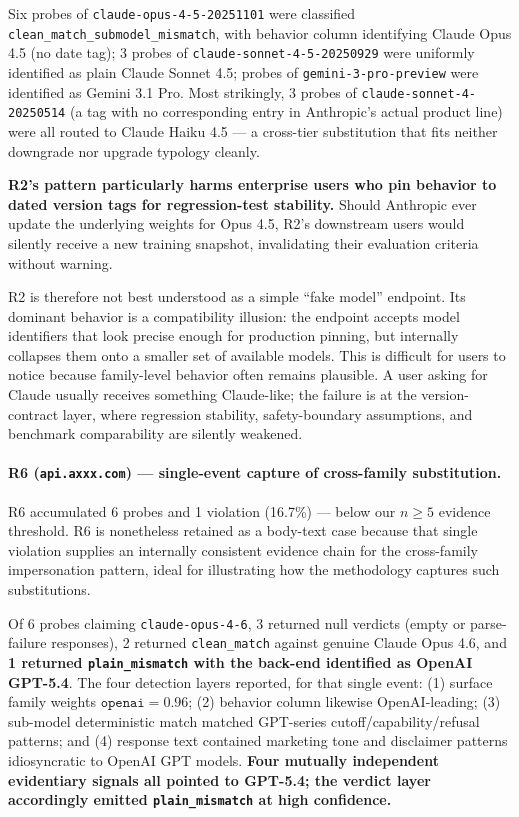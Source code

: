 \documentclass[10pt,a4paper,twocolumn]{article}
\begin{document}
Six probes of \texttt{claude-opus-4-5-20251101} were classified
\texttt{clean\_match\_submodel\_mismatch}, with behavior column identifying
Claude Opus 4.5 (no date tag); 3 probes of \texttt{claude-sonnet-4-5-20250929}
were uniformly identified as plain Claude Sonnet 4.5; probes of
\texttt{gemini-3-pro-preview} were identified as Gemini 3.1 Pro. Most
strikingly, 3 probes of \texttt{claude-sonnet-4-20250514} (a tag with no
corresponding entry in Anthropic's actual product line) were all routed to
Claude Haiku 4.5 --- a cross-tier substitution that fits neither downgrade nor
upgrade typology cleanly.

\textbf{R2's pattern particularly harms enterprise users who pin behavior to
dated version tags for regression-test stability.} Should Anthropic ever update
the underlying weights for Opus 4.5, R2's downstream users would silently
receive a new training snapshot, invalidating their evaluation criteria
without warning.

R2 is therefore not best understood as a simple ``fake model'' endpoint. Its
dominant behavior is a compatibility illusion: the endpoint accepts model
identifiers that look precise enough for production pinning, but internally
collapses them onto a smaller set of available models. This is difficult for
users to notice because family-level behavior often remains plausible. A user
asking for Claude usually receives something Claude-like; the failure is at
the version-contract layer, where regression stability, safety-boundary
assumptions, and benchmark comparability are silently weakened.

\paragraph{R6 (\texttt{api.axxx.com}) --- single-event capture of cross-family substitution.}
R6 accumulated 6 probes and 1 violation (16.7\%) --- below our $n{\geq}5$
evidence threshold. R6 is nonetheless retained as a body-text case because that
single violation supplies an internally consistent evidence chain for the cross-family
impersonation pattern, ideal for illustrating how the methodology captures
such substitutions.

Of 6 probes claiming \texttt{claude-opus-4-6}, 3 returned null verdicts (empty
or parse-failure responses), 2 returned \texttt{clean\_match} against genuine
Claude Opus 4.6, and \textbf{1 returned \texttt{plain\_mismatch} with the
back-end identified as OpenAI GPT-5.4}. The four detection layers reported,
for that single event: (1) surface family weights $\texttt{openai}=0.96$;
(2) behavior column likewise OpenAI-leading; (3) sub-model deterministic match
matched GPT-series cutoff/capability/refusal patterns; and (4) response text
contained marketing tone and disclaimer patterns idiosyncratic to OpenAI GPT
models. \textbf{Four mutually independent evidentiary signals all pointed to
GPT-5.4; the verdict layer accordingly emitted \texttt{plain\_mismatch} at high
confidence.}
\end{document}
